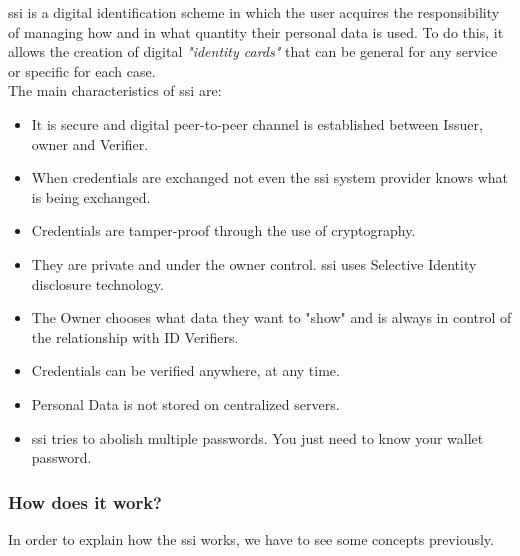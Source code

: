 \documentclass[a4paper, 12pt]{article} %
\begin{document}
            \acrfull{ssi} is a digital identification scheme in which the user acquires the responsibility of managing how and in what quantity their personal data is used. To do this, it allows the creation of digital \textit{"identity cards"} that can be general for any service or specific for each case. \\
            The main characteristics of \acrlong{ssi} are\cite{ssi-guide}:
            \begin{itemize}
                \item It is secure and digital peer-to-peer channel is established between Issuer, owner and Verifier.
                \item When credentials are exchanged not even the \acrlong{ssi} system provider knows what is being exchanged.
                \item Credentials are tamper-proof through the use of cryptography.
                \item They are private and under the owner control. \acrshort{ssi} uses Selective Identity disclosure technology.
                \item The Owner chooses what data they want to "show" and is always in control of the relationship with ID Verifiers.
                \item Credentials can be verified anywhere, at any time.
                \item Personal Data is not stored on centralized servers.
                \item \acrshort{ssi} tries to abolish multiple passwords. You just need to know your wallet password.
            \end{itemize}

            \subsubsection{How does it work?}
                In order to explain how the \acrshort{ssi} works, we have to see some concepts previously.
\end{document}

